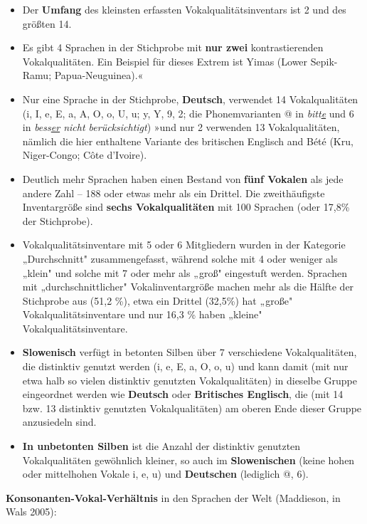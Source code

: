 \documentclass[
]{article}
\begin{document}
\begin{itemize}
\item
  Der \textbf{Umfang} des kleinsten erfassten Vokalqualitätsinventars ist 2
  und des größten 14.
\item
  Es gibt 4 Sprachen in der Stichprobe mit \textbf{nur zwei}
  kontrastierenden Vokalqualitäten. Ein Beispiel für dieses Extrem ist
  Yimas (Lower Sepik-Ramu; Papua-Neuguinea).«
\item
  Nur eine Sprache in der Stichprobe, \textbf{Deutsch}, verwendet 14
  Vokalqualitäten (i, I, e, E, a, A, O, o, U, u; y, Y, 9, 2; die
  Phonemvarianten @ in \emph{bitt\underline{e}} und 6 in \emph{bess\underline{er} nicht
  berücksichtigt}) »und nur 2 verwenden 13 Vokalqualitäten, nämlich
  die hier enthaltene Variante des britischen Englisch and Bété (Kru,
  Niger-Congo; Côte d'Ivoire).
\item
  Deutlich mehr Sprachen haben einen Bestand von \textbf{fünf Vokalen} als
  jede andere Zahl -- 188 oder etwas mehr als ein Drittel. Die
  zweithäufigste Inventargröße sind \textbf{sechs Vokalqualitäten} mit 100
  Sprachen (oder 17,8\% der Stichprobe).
\item
  Vokalqualitätsinventare mit 5 oder 6 Mitgliedern wurden in der
  Kategorie „Durchschnitt" zusammengefasst, während solche mit 4 oder
  weniger als „klein" und solche mit 7 oder mehr als „groß" eingestuft
  werden. Sprachen mit „durchschnittlicher" Vokalinventargröße machen
  mehr als die Hälfte der Stichprobe aus (51,2 \%), etwa ein Drittel
  (32,5\%) hat „große" Vokalqualitätsinventare und nur 16,3 \% haben
  „kleine" Vokalqualitätsinventare.
\item
  \textbf{Slowenisch} verfügt in betonten Silben über 7 verschiedene
  Vokalqualitäten, die distinktiv genutzt werden (i, e, E, a, O, o, u)
  und kann damit (mit nur etwa halb so vielen distinktiv genutzten
  Vokalqualitäten) in dieselbe Gruppe eingeordnet werden wie
  \textbf{Deutsch} oder \textbf{Britisches Englisch}, die (mit 14 bzw. 13
  distinktiv genutzten Vokalqualitäten) am oberen Ende dieser Gruppe
  anzusiedeln sind.
\item
  \textbf{In unbetonten Silben} ist die Anzahl der distinktiv genutzten
  Vokalqualitäten gewöhnlich kleiner, so auch im \textbf{Slowenischen}
  (keine hohen oder mittelhohen Vokale i, e, u) und \textbf{Deutschen}
  (lediglich @, 6).
\end{itemize}

\textbf{Konsonanten-Vokal-Verhältnis} in den Sprachen der Welt (Maddieson, in
Wals 2005):
\end{document}
